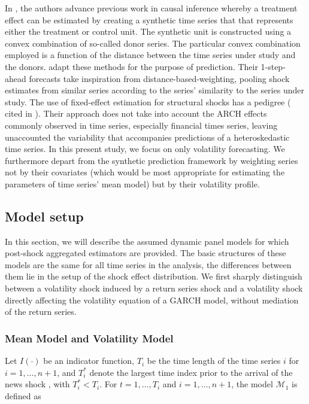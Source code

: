 \documentclass[11pt]{article}
\def\mc#1{\mathcal{#1}} %
\def\mc#1{\mathcal{#1}}
\theoremstyle{definition}
\begin{document}
In \citet{abadie2010synthetic}, the authors advance previous work in causal inference whereby a treatment effect can be estimated by creating a synthetic time series that that represents either the treatment or control unit.  The synthetic unit is constructed using a convex combination of so-called donor series.  The particular convex combination employed is a function of the distance between the time series under study and the donors. \citet{lin2021minimizing} adapt these methods for the purpose of prediction.  Their 1-step-ahead forecasts take inspiration from distance-based-weighting, pooling shock estimates from similar series according to the series' similarity to the series under study.  The use of fixed-effect estimation for structural shocks has a pedigree (\citet{romer1989does} cited in \citet{kilian2017structural}).  Their approach does not take into account the ARCH effects commonly observed in time series, especially financial times series, leaving unaccounted the variability that accompanies predictions of a heteroskedastic time series.  In this present study, we focus on only volatility forecasting.  We furthermore depart from the synthetic prediction framework by weighting series not by their covariates (which would be most appropriate for estimating the parameters of time series' mean model) but by their volatility profile.


\subsection{Model setup}
\label{modelsetup}
In this section, we will describe the assumed dynamic panel models for which 
post-shock aggregated estimators are provided. The basic structures of these models 
are the same for all time series in the analysis, the differences between them lie in the setup of the shock effect distribution.  We first sharply distinguish between a volatility shock induced by a return series shock and a volatility shock directly affecting the volatility equation of a GARCH model, without mediation of the return series.

\subsubsection{Mean Model and Volatility Model}

Let $I(\cdot)$ be an indicator function, $T_i$ be the time length of the time series $i$ for $i = 1, \ldots, n+1$, and $T_i^*$ denote the largest time index prior to the arrival of the news shock , with $T_i^* < T_i$.  For $t= 1, \ldots, T_i$ and $i = 1, \ldots, n+1$, the model $\mc{M}_1$ is defined as
\end{document}
